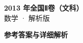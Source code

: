 \documentclass[zihao=-4, a4paper]{ctexart}
\begin{document}
\begin{center}
  {\Large\bfseries 2013 年全国Ⅱ卷（文科）}\\[4pt]
  {\large 数学 · 解析版}
\end{center}
\medskip
{}

\clearpage
{}
\begin{center}{\Large\bfseries 参考答案与详细解析}\end{center}
\medskip

\end{document}
